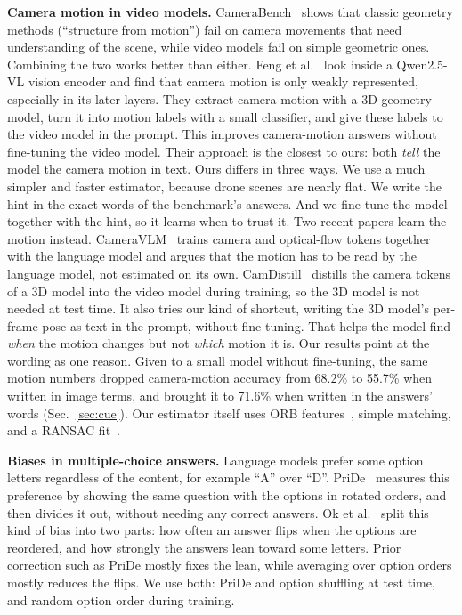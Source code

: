 \textbf{Camera motion in video models.} CameraBench~\cite{lin2025camerabench}
shows that classic geometry methods (``structure from motion'') fail on
camera movements that need understanding of the scene, while video models
fail on simple geometric ones. Combining the two works better than either.
Feng et al.~\cite{feng2026geocam} look inside a Qwen2.5-VL vision encoder
and find that camera motion is only weakly represented, especially in its
later layers. They extract camera motion with a 3D geometry model, turn it
into motion labels with a small classifier, and give these labels to the
video model in the prompt. This improves camera-motion answers without
fine-tuning the video model. Their approach is the closest to ours: both
\emph{tell} the model the camera motion in text. Ours differs in three
ways. We use a much simpler and faster estimator, because drone scenes are
nearly flat. We write the hint in the exact words of the benchmark's
answers. And we fine-tune the model together with the hint, so it learns
when to trust it. Two recent papers learn the motion instead.
CameraVLM~\cite{cheng2026cameravlm} trains camera and optical-flow tokens
together with the language model and argues that the motion has to be read
by the language model, not estimated on its own. CamDistill~\cite{du2026camdistill}
distills the camera tokens of a 3D model into the video model during
training, so the 3D model is not needed at test time. It also tries our kind
of shortcut, writing the 3D model's per-frame pose as text in the prompt,
without fine-tuning. That helps the model find \emph{when} the motion
changes but not \emph{which} motion it is. Our results point at the wording
as one reason. Given to a small model without fine-tuning, the same motion
numbers dropped camera-motion accuracy from 68.2\% to 55.7\% when written in
image terms, and brought it to 71.6\% when written in the answers' words
(Sec.~\ref{sec:cue}). Our estimator itself uses ORB
features~\cite{rublee2011orb}, simple matching, and a RANSAC
fit~\cite{fischler1981ransac}.

\textbf{Biases in multiple-choice answers.} Language models prefer some
option letters regardless of the content, for example ``A'' over ``D''.
PriDe~\cite{zheng2024pride} measures this preference by showing the same
question with the options in rotated orders, and then divides it out,
without needing any correct answers. Ok et al.~\cite{ok2026optionbias}
split this kind of bias into two parts: how often an answer flips when the
options are reordered, and how strongly the answers lean toward some
letters. Prior correction such as PriDe mostly fixes the lean, while
averaging over option orders mostly reduces the flips. We use both: PriDe
and option shuffling at test time, and random option order during training.

